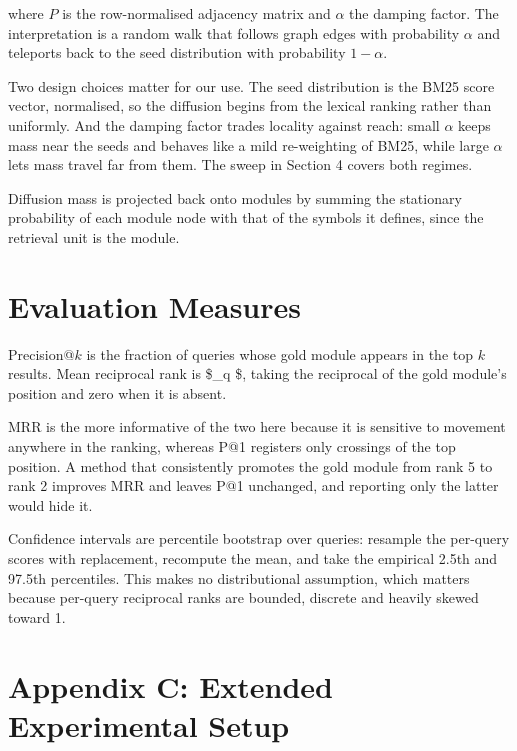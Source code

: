 \documentclass[10pt,journal,compsoc,twocolumn]{IEEEtran}
\begin{document}
where $P$ is the row-normalised adjacency matrix and $\alpha$ the damping factor. The interpretation is a random walk that follows graph edges with probability $\alpha$ and teleports back to the seed distribution with probability $1 - \alpha$.

Two design choices matter for our use. The seed distribution is the BM25 score vector, normalised, so the diffusion begins from the lexical ranking rather than uniformly. And the damping factor trades locality against reach: small $\alpha$ keeps mass near the seeds and behaves like a mild re-weighting of BM25, while large $\alpha$ lets mass travel far from them. The sweep in Section 4 covers both regimes.

Diffusion mass is projected back onto modules by summing the stationary probability of each module node with that of the symbols it defines, since the retrieval unit is the module.


\section{Evaluation Measures}


Precision@$k$ is the fraction of queries whose gold module appears in the top $k$ results. Mean reciprocal rank is \$\sum\_{q} \$, taking the reciprocal of the gold module's position and zero when it is absent.

MRR is the more informative of the two here because it is sensitive to movement anywhere in the ranking, whereas P@1 registers only crossings of the top position. A method that consistently promotes the gold module from rank 5 to rank 2 improves MRR and leaves P@1 unchanged, and reporting only the latter would hide it.

Confidence intervals are percentile bootstrap over queries: resample the per-query scores with replacement, recompute the mean, and take the empirical 2.5th and 97.5th percentiles. This makes no distributional assumption, which matters because per-query reciprocal ranks are bounded, discrete and heavily skewed toward 1.




\section{Appendix C: Extended Experimental Setup}
\end{document}
